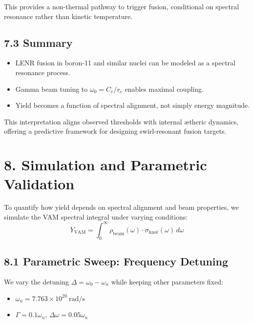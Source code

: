 This provides a non-thermal pathway to trigger fusion, conditional on spectral resonance rather than kinetic temperature.

\subsection*{7.3 Summary}

\begin{itemize}
  \item LENR fusion in boron-11 and similar nuclei can be modeled as a spectral resonance process.
  \item Gamma beam tuning to $\omega_0 = C_e / r_c$ enables maximal coupling.
  \item Yield becomes a function of spectral alignment, not simply energy magnitude.
\end{itemize}

This interpretation aligns observed thresholds with internal ætheric dynamics, offering a predictive framework for designing swirl-resonant fusion targets.


\section*{8. Simulation and Parametric Validation}

To quantify how yield depends on spectral alignment and beam properties, we simulate the VAM spectral integral under varying conditions:
\begin{equation}
Y_{\mathrm{VAM}} = \int_0^\infty \rho_{\mathrm{beam}}(\omega) \cdot \sigma_{\mathrm{knot}}(\omega) \, d\omega
\end{equation}

\subsection*{8.1 Parametric Sweep: Frequency Detuning}
We vary the detuning \( \Delta = \omega_0 - \omega_n \) while keeping other parameters fixed:

\begin{itemize}
  \item $\omega_n = 7.763 \times 10^{20} \ \mathrm{rad/s}$
  \item $\Gamma = 0.1 \omega_n$, $\Delta\omega = 0.05 \omega_n$
\end{itemize}

